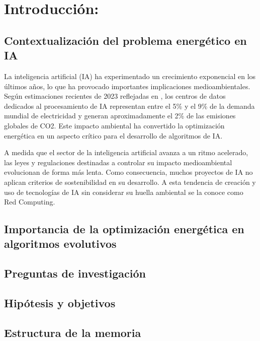 \chapter{Introducción:}

\section{Contextualización del problema energético en IA}

La inteligencia artificial (IA) ha experimentado un crecimiento exponencial en los últimos años, lo que ha provocado importantes implicaciones medioambientales. Según estimaciones recientes de 2023 reflejadas en \cite{cotta2024consumo}, los centros de datos dedicados al procesamiento de IA representan entre el 5\% y el 9\% de la demanda mundial de electricidad y generan aproximadamente el 2\% de las emisiones globales de CO2. Este impacto ambiental ha convertido la optimización energética en un aspecto crítico para el desarrollo de algoritmos de IA.

A medida que el sector de la inteligencia artificial avanza a un ritmo acelerado, las leyes y regulaciones destinadas a controlar su impacto medioambiental evolucionan de forma más lenta. Como consecuencia, muchos proyectos de IA no aplican criterios de sostenibilidad en su desarrollo. A esta tendencia de creación y uso de tecnologías de IA sin considerar su huella ambiental se la conoce como Red Computing.\cite{zhou2023opportunities}

\section{Importancia de la optimización energética en algoritmos evolutivos}

\section{Preguntas de investigación}

\section{Hipótesis y objetivos}

\section{Estructura de la memoria}